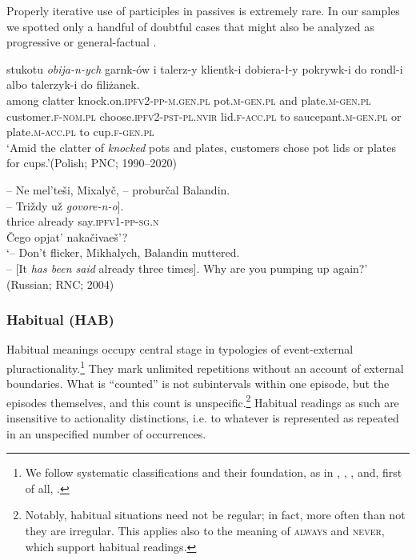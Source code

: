 \documentclass[output=paper]{langscibook}
\begin{document}
Properly iterative use of participles in passives is extremely rare. In our samples we spotted only a handful of doubtful cases that might also be analyzed as progressive  or general-factual .

\ea\label{wiem:ex:knocked} 
 {stukotu} {\textit{obija-n-ych}} {garnk-ów} {i} {talerz-y} {klientk-i} {dobiera-ł-y} {pokrywk-i} {do} {rondl-i}  {albo} {talerzyk-i} {do} {filiżanek}.\\
among clatter knock.on.\textsc{ipfv2-pp-m.gen.pl} pot.\textsc{m-gen.pl} and plate.\textsc{m-gen.pl} customer.\textsc{f-nom.pl} choose.\textsc{ipfv2-pst-pl.nvir} lid.\textsc{f-acc.pl} 
to saucepant.\textsc{m-gen.pl} or plate.\textsc{m-acc.pl} to cup.\textsc{f-gen.pl}\\
\glt ‘Amid the clatter of \textit{knocked} pots and plates, customers chose pot lids or plates for cups.’\hfill (Polish; PNC; 1990--2020)
\z

\ea\label{wiem:ex:tri-said}
-- {Ne mel’teši, Mixalyč,} -- {proburčal Balandin.}\\
\gll -- \minsp{[} {Triždy} {už} \textit{{govore-n-o}}].\\
{} {} thrice already say.\textsc{ipfv1-pp-sg.n}\\
{Čego opjat’ nakačivaeš’}?\\
\glt ‘-- Don’t flicker, Mikhalych, Balandin muttered. \\-- [It \textit{has been said} already three times]. Why are you pumping up again?’\\
\hfill (Russian; RNC; 2004)
\z 

\subsubsection{Habitual (HAB)}

Habitual meanings occupy central stage in typologies of event-external pluractionality.\footnote{\label{wiem:foot:WeFollowSystem}We follow systematic classifications and their foundation, as in \citet{Cusic1981}, \citet{Xrakovskij1997}, \citet{Mattiola2019}, and, first of all, \citet{Šluinskij2005,Šluinskij2006}.} They mark unlimited repetitions without an account of external boundaries. What is “counted” is not subintervals within one episode, but the episodes themselves, and this count is unspecific.\footnote{Notably, habitual situations need not be regular; in fact, more often than not they are irregular. This applies also to the meaning of \textsc{always} and \textsc{never}, which support habitual readings.} Habitual readings as such are insensitive to actionality distinctions, i.e. to whatever is represented as repeated in an unspecified number of occurrences.\largerpage[-1]
\end{document}
